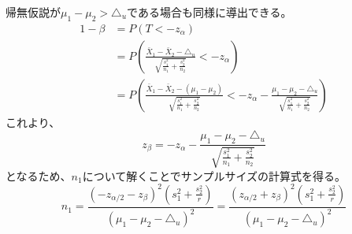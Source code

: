 帰無仮説が$\mu_{1} - \mu_{2} > \triangle_{u}$である場合も同様に導出できる。
\begin{align}
    1 - \beta & = P(T < -z_{\alpha})                                                                                                                                                                                                                                \\
              & = P\left(\frac{\bar{X}_{1} - \bar{X}_{2} - \triangle_{u}}{\sqrt{\frac{s_{1}^{2}}{n_{1}} + \frac{s_{2}^{2}}{n_{2}}}} < -z_{\alpha}\right)                                                                                                            \\
              & = P\left(\frac{\bar{X}_{1} - \bar{X}_{2} - (\mu_{1} - \mu_{2})}{\sqrt{\frac{s_{1}^{2}}{n_{1}} + \frac{s_{2}^{2}}{n_{2}}}} < -z_{\alpha} - \frac{\mu_{1} - \mu_{2} - \triangle_{u}}{\sqrt{\frac{s_{1}^{2}}{n_{1}} + \frac{s_{2}^{2}}{n_{2}}}}\right)
\end{align}
これより、
\begin{equation}
    z_{\beta} = -z_{\alpha} - \frac{\mu_{1} - \mu_{2} - \triangle_{u}}{\sqrt{\frac{s_{1}^{2}}{n_{1}} + \frac{s_{2}^{2}}{n_{2}}}}
\end{equation}
となるため、$n_{1}$について解くことでサンプルサイズの計算式を得る。
\begin{equation}
    n_{1} = \frac{(-z_{\alpha/2} - z_{\beta})^{2} \left(s_{1}^{2} + \frac{s_{2}^{2}}{r}\right)}{(\mu_{1} - \mu_{2} - \triangle_{u})^{2}} = \frac{(z_{\alpha/2} + z_{\beta})^{2} \left(s_{1}^{2} + \frac{s_{2}^{2}}{r}\right)}{(\mu_{1} - \mu_{2} - \triangle_{u})^{2}}
\end{equation}
